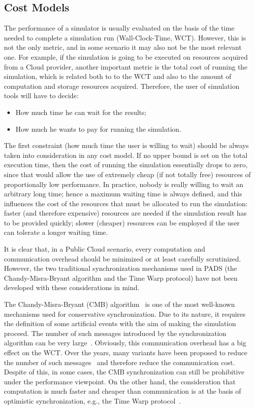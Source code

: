 \documentclass[1p]{elsarticle}
\begin{document}
\subsection{Cost Models}\label{sec:cost-model}

The performance of a simulator is usually evaluated on the basis of
the time needed to complete a simulation run (Wall-Clock-Time,
WCT). However, this is not the only metric, and in some scenario it
may also not be the most relevant one.  For example, if the simulation
is going to be executed on resources acquired from a Cloud provider,
another important metric is the total cost of running the simulation,
which is related both to to the WCT and also to the amount of
computation and storage resources acquired. Therefore, the user of
simulation tools will have to decide:
\begin{itemize}
\item How much time he can wait for the results;
\item How much he wants to pay for running the simulation.
\end{itemize}

The first constraint (how much time the user is willing to
  wait) should be always taken into consideration in any cost model.
  If no upper bound is set on the total execution time, then the cost
  of running the simulation essentially drops to zero, since that
  would allow the use of extremely cheap (if not totally free)
  resources of proportionally low performance. In practice, nobody is
  really willing to wait an arbitrary long time; hence a maximum
  waiting time is always defined, and this influences the cost of the
  resources that must be allocated to run the simulation: faster (and
  therefore expensive) resources are needed if the simulation result
  has to be provided quickly; slower (cheaper) resources can be
  employed if the user can tolerate a longer waiting time.

It is clear that, in a Public Cloud scenario, every computation and
communication overhead should be minimized or at least carefully
scrutinized. However, the two traditional synchronization mechanisms
used in PADS (the Chandy-Misra-Bryant algorithm and the Time Warp
protocol) have not been developed with these considerations in mind.

The Chandy-Misra-Bryant (CMB) algorithm~\cite{misra86} is one of the most
well-known mechanisms used for conservative synchronization.  Due to
its nature, it requires the definition of some artificial events with 
the aim of making the simulation
proceed. The number of such messages introduced by the synchronization
algorithm can be very large~\cite{devries1990,rizvi2006}. Obviously, 
this communication overhead has a big effect on the WCT. Over the
years, many variants have been proposed to reduce the number of such
messages~\cite{Su:1988:VCD:865909} and therefore reduce the 
communication cost. Despite of this, in some cases, the CMB 
synchronization can still be prohibitive under the performance 
viewpoint. On the other hand, the consideration that computation is
much faster and cheaper than communication is at the basis of optimistic
synchronization, e.g., the Time Warp protocol~\cite{timewarp}.  
\end{document}
